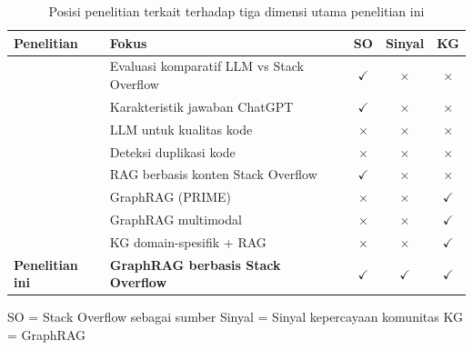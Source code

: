 \begin{table}[!htbp]
\centering
\caption{Posisi penelitian terkait terhadap tiga dimensi utama penelitian ini}
\label{tab:penelitian_terkait}
\small
\renewcommand{\arraystretch}{1.2}

\begin{tabularx}{\textwidth}{|>{\hsize=0.7\hsize}X|>{\hsize=1.3\hsize}X|c|c|c|}
\hline
\textbf{Penelitian} &
\textbf{Fokus} &
\textbf{SO} &
\textbf{Sinyal} &
\textbf{KG} \\
\hline

\textcite{DaSilva2025} &
Evaluasi komparatif LLM vs Stack Overflow &
$\checkmark$ & $\times$ & $\times$ \\ \hline

\textcite{Kabir2024} &
Karakteristik jawaban ChatGPT &
$\checkmark$ & $\times$ & $\times$ \\ \hline

\textcite{Alomari2026} &
LLM untuk kualitas kode &
$\times$ & $\times$ & $\times$ \\ \hline

\textcite{Jiang2026} &
Deteksi duplikasi kode &
$\times$ & $\times$ & $\times$ \\ \hline

\textcite{Nashid2023} &
RAG berbasis konten Stack Overflow &
$\checkmark$ & $\times$ & $\times$ \\ \hline

\textcite{Wang2026} &
GraphRAG (PRIME) &
$\times$ & $\times$ & $\checkmark$ \\ \hline

\textcite{Ali2026} &
GraphRAG multimodal &
$\times$ & $\times$ & $\checkmark$ \\ \hline

\textcite{Zhou2026} &
KG domain-spesifik + RAG &
$\times$ & $\times$ & $\checkmark$ \\ \hline

\textbf{Penelitian ini} &
\textbf{GraphRAG berbasis Stack Overflow} &
$\checkmark$ & $\checkmark$ & $\checkmark$ \\ \hline

\end{tabularx}

\vspace{0.2cm}
\footnotesize
SO = Stack Overflow sebagai sumber \quad
Sinyal = Sinyal kepercayaan komunitas \quad
KG = GraphRAG

\end{table}